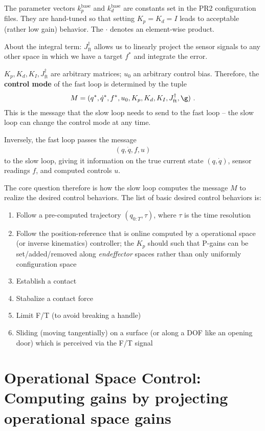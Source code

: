 \documentclass[10pt,fleqn,twoside]{article}
\newcommand{\ft}{\text{ft}}
\begin{document}
The parameter vectors $k_p^\text{base}$ and $k_d^\text{base}$ are
constants set in the PR2 configuration files. They are hand-tuned so
that setting $K_p=K_d=I$ leads to acceptable (rather low gain)
behavior. The $\cdot$ denotes an element-wise product.

About the integral term: $J_\ft^\dag$ allows us to linearly project the
sensor signals to any other space in which we have a target $f^*$ and
integrate the error.

$K_p, K_d, K_I, J_\ft^\dag$ are arbitrary matrices; $u_0$ an arbitrary
control bias. Therefore, the \textbf{control mode} of the fast loop is
determined by the tuple
\begin{align}
M = (q^*, \dot q^*, f^*, u_0, K_p, K_d, K_I, J_\ft^\dag, \g) ~.
\end{align}
This is the message that the slow loop needs to send to the fast loop
-- the slow loop can change the control mode at any time.

Inversely, the fast loop passes the message
\begin{align}
(q, \dot q, f, u)
\end{align}
to the slow loop, giving it information on the true current state
 $(q, \dot q)$, sensor readings $f$, and computed controls $u$.

The core question therefore is how the slow loop computes the message
$M$ to realize the desired control behaviors. The list of basic desired
control behaviors is:
\begin{enumerate}
\item Follow a pre-computed trajectory $(q_{0:T},\tau)$, where $\tau$
is the time resolution
\item Follow the position-reference that is online computed by a
operational space (or inverse kinematics) controller; the $K_p$ should
such that P-gains can be set/added/removed along \emph{endeffector}
spaces rather than only uniformly configuration space
\item Establish a contact
\item Stabalize a contact force
\item Limit F/T (to avoid breaking a handle)
\item Sliding (moving tangentially) on a surface (or along a DOF like
  an opening door) which is perceived via the F/T signal
\end{enumerate}


\section{Operational Space Control: Computing gains by projecting
operational space gains}
\end{document}
